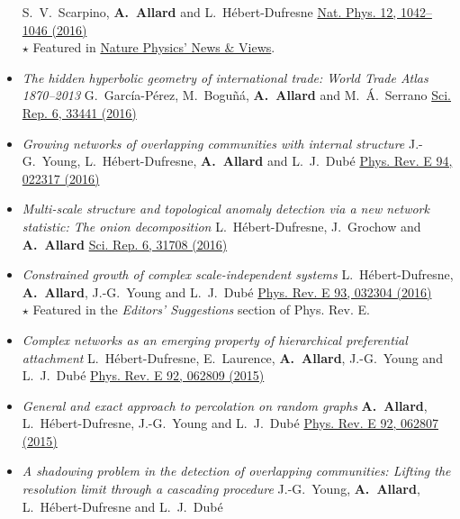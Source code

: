 \documentclass[11pt]{article}
\begin{document}
\begin{itemize}[itemsep=0.5em]
  S.~V.~Scarpino, \textbf{A.~Allard} and L.~H\'ebert-Dufresne\split
  \href{http://dx.doi.org/10.1038/nphys3832}{Nat. Phys. 12, 1042--1046 (2016)}\\
  {\footnotesize $\star$ Featured in \href{http://dx.doi.org/10.1038/nphys3939}{Nature Physics' News \& Views}.}%
%
  \item \textit{The hidden hyperbolic geometry of international trade: World Trade Atlas 1870--2013}\split
  G.~Garc\'ia-P\'erez, M.~Bogu\~n\'a, \textbf{A.~Allard} and M.~\'A.~Serrano\split
  \href{http://dx.doi.org/10.1038/srep33441}{Sci. Rep. 6, 33441 (2016)}
%
  \item \textit{Growing networks of overlapping communities with internal structure}\split
  J.-G.~Young, L.~H\'ebert-Dufresne, \textbf{A.~Allard} and L.~J.~Dub\'e\split
  \href{http://dx.doi.org/10.1103/PhysRevE.94.022317}{Phys. Rev. E 94, 022317 (2016)}
%
  \item \textit{Multi-scale structure and topological anomaly detection via a new network statistic: The onion decomposition}\split
  L.~H\'ebert-Dufresne, J.~Grochow and \textbf{A.~Allard}\split
  \href{http://dx.doi.org/10.1038/srep31708}{Sci. Rep. 6, 31708 (2016)}
%
  \item \textit{Constrained growth of complex scale-independent systems}\split
  L.~H\'ebert-Dufresne, \textbf{A.~Allard}, J.-G.~Young and L.~J.~Dub\'e\split
  \href{http://dx.doi.org/10.1103/PhysRevE.93.032304}{Phys. Rev. E 93, 032304 (2016)}\\
  {\footnotesize $\star$ Featured in the \textit{Editors' Suggestions} section of Phys. Rev. E.}
%
  \item \textit{Complex networks as an emerging property of hierarchical preferential attachment}\split
  L.~H\'ebert-Dufresne, E.~Laurence, \textbf{A.~Allard}, J.-G.~Young and L.~J.~Dub\'e\split
  \href{http://dx.doi.org/10.1103/PhysRevE.92.062809}{Phys. Rev. E 92, 062809 (2015)}
%
  \item \textit{General and exact approach to percolation on random graphs}\split
  \textbf{A.~Allard}, L.~H\'ebert-Dufresne, J.-G.~Young and L.~J.~Dub\'e\split
  \href{http://dx.doi.org/10.1103/PhysRevE.92.062807}{Phys. Rev. E 92, 062807 (2015)}
%
  \item \textit{A shadowing problem in the detection of overlapping communities: Lifting the resolution limit through a cascading procedure}\split
  J.-G.~Young, \textbf{A.~Allard}, L.~H\'ebert-Dufresne and L.~J.~Dub\'e\split

\end{itemize}
\end{document}
